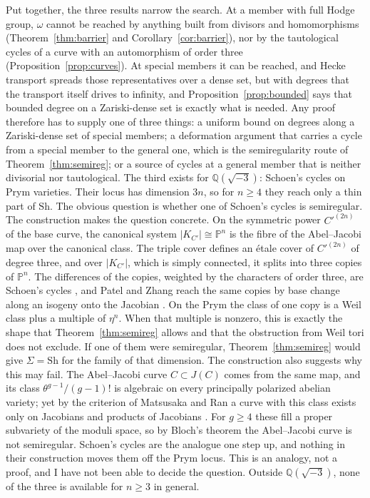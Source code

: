 \documentclass[11pt]{amsart}
\theoremstyle{definition}
\theoremstyle{remark}
\newcommand{\QQ}{\mathbb{Q}}
\newcommand{\PP}{\mathbb{P}}
\newcommand{\Sh}{\mathrm{Sh}}
\begin{document}
Put together, the three results narrow the search. At a member with full
Hodge group, $\omega$ cannot be reached by anything built from divisors and
homomorphisms (Theorem~\ref{thm:barrier} and
Corollary~\ref{cor:barrier}), nor by the tautological cycles of a curve
with an automorphism of order three (Proposition~\ref{prop:curves}). At
special members it can be reached, and Hecke transport spreads those
representatives over a dense set, but with degrees that the transport
itself drives to infinity, and Proposition~\ref{prop:bounded} says that
bounded degree on a Zariski-dense set is exactly what is needed. Any proof
therefore has to supply one of three things: a uniform bound on degrees
along a Zariski-dense set of special members; a deformation argument that
carries a cycle from a special member to the general one, which is the
semiregularity route of Theorem~\ref{thm:semireg}; or a source of cycles at
a general member that is neither divisorial nor tautological. The third
exists for $\QQ(\sqrt{-3})$: Schoen's cycles on Prym varieties. Their
locus has dimension $3n$, so for $n\ge4$ they reach only a thin part of
$\Sh$. The obvious question is whether one of Schoen's cycles is
semiregular. The construction makes the question concrete. On the
symmetric power $C'^{(2n)}$ of the base curve, the canonical system
$|K_{C'}|\cong\PP^{n}$ is the fibre of the Abel--Jacobi map over the
canonical class. The triple cover defines an \'etale cover of $C'^{(2n)}$
of degree three, and over $|K_{C'}|$, which is simply connected, it splits
into three copies of $\PP^{n}$. The differences of the copies, weighted by
the characters of order three, are Schoen's cycles
\cite[Theorem~2.0 with $r=0$]{Sch88}, and Patel and Zhang reach the same
copies by base change along an isogeny onto the Jacobian
\cite[Theorem~1.1]{PZ25}. On the Prym the class of one copy is a Weil
class plus a multiple of $\eta^{n}$. When
that multiple is nonzero, this is exactly the shape that Theorem~\ref{thm:semireg}
allows and that the obstruction from Weil tori does not exclude. If one of them were
semiregular, Theorem~\ref{thm:semireg} would give $\Sigma=\Sh$ for the
family of that dimension. The construction also suggests why this may
fail. The Abel--Jacobi curve $C\subset J(C)$ comes from the same map, and
its class $\theta^{g-1}/(g-1)!$ is algebraic on every principally polarized
abelian variety; yet by the criterion of Matsusaka and Ran a curve with this
class exists only on Jacobians and products of Jacobians
\cite{Mat59,Ran81}. For $g\ge4$ these fill a proper subvariety of the
moduli space, so by Bloch's theorem the Abel--Jacobi curve is not
semiregular. Schoen's cycles are the analogue one step up, and nothing in
their construction moves them off the Prym locus. This is an analogy, not a
proof, and I have not been able to decide the question. Outside
$\QQ(\sqrt{-3})$, none of the three is available for $n\ge3$ in general.
\end{document}
